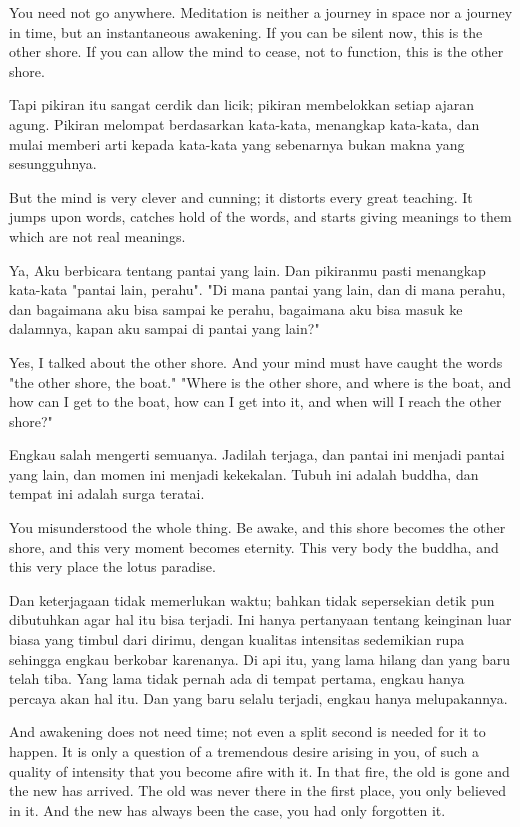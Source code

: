 \english
You need not go anywhere. Meditation is neither a journey in space nor a journey in time, but an instantaneous awakening. If you can be silent now, this is the other shore. If you can allow the mind to cease, not to function, this is the other shore.

\bahasa
Tapi pikiran itu sangat cerdik dan licik; pikiran membelokkan setiap ajaran agung. Pikiran melompat berdasarkan kata-kata, menangkap kata-kata, dan mulai memberi arti kepada kata-kata yang sebenarnya bukan makna yang sesungguhnya.

\english
But the mind is very clever and cunning; it distorts every great teaching. It jumps upon words, catches hold of the words, and starts giving meanings to them which are not real meanings.

\bahasa
Ya, Aku berbicara tentang pantai yang lain. Dan pikiranmu pasti menangkap kata-kata "pantai lain, perahu". "Di mana pantai yang lain, dan di mana perahu, dan bagaimana aku bisa sampai ke perahu, bagaimana aku bisa masuk ke dalamnya, kapan aku sampai di pantai yang lain?"

\english
Yes, I talked about the other shore. And your mind must have caught the words "the other shore, the boat." "Where is the other shore, and where is the boat, and how can I get to the boat, how can I get into it, and when will I reach the other shore?"

\bahasa
Engkau salah mengerti semuanya. Jadilah terjaga, dan pantai ini menjadi pantai yang lain, dan momen ini menjadi kekekalan. Tubuh ini adalah buddha, dan tempat ini adalah surga teratai.

\english
You misunderstood the whole thing. Be awake, and this shore becomes the other shore, and this very moment becomes eternity. This very body the buddha, and this very place the lotus paradise.

\bahasa
Dan keterjagaan tidak memerlukan waktu; bahkan tidak sepersekian detik pun dibutuhkan agar hal itu bisa terjadi. Ini hanya pertanyaan tentang keinginan luar biasa yang timbul dari dirimu, dengan kualitas intensitas sedemikian rupa sehingga engkau berkobar karenanya. Di api itu, yang lama hilang dan yang baru telah tiba. Yang lama tidak pernah ada di tempat pertama, engkau hanya percaya akan hal itu. Dan yang baru selalu terjadi, engkau hanya melupakannya.

\english
And awakening does not need time; not even a split second is needed for it to happen. It is only a question of a tremendous desire arising in you, of such a quality of intensity that you become afire with it. In that fire, the old is gone and the new has arrived. The old was never there in the first place, you only believed in it. And the new has always been the case, you had only forgotten it.

